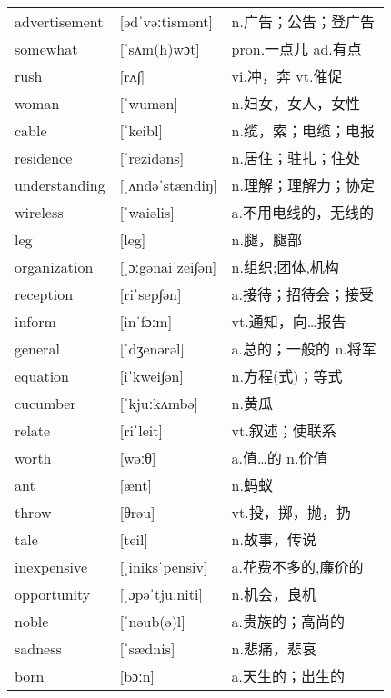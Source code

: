 \documentclass[a4paper]{article}
\begin{document}
\section{}
\begin{tabular}{l l l}

advertisement & [ədˈvəːtismənt] & n.广告；公告；登广告 \\
somewhat & [ˈsʌm(h)wɔt] & pron.一点儿 ad.有点 \\
rush & [rʌ∫] & vi.冲，奔 vt.催促 \\
woman & [ˈwumən] & n.妇女，女人，女性 \\
cable & [ˈkeibl] & n.缆，索；电缆；电报 \\
residence & [ˈrezidəns] & n.居住；驻扎；住处 \\
understanding & [ˌʌndəˈstændiŋ] & n.理解；理解力；协定 \\
wireless & [ˈwaiəlis] & a.不用电线的，无线的 \\
leg & [leg] & n.腿，腿部 \\
organization & [ˌɔːgənaiˈzei∫ən] & n.组织;团体,机构 \\
reception & [riˈsep∫ən] & a.接待；招待会；接受 \\
inform & [inˈfɔːm] & vt.通知，向…报告 \\
general & [ˈdʒenərəl] & a.总的；一般的 n.将军 \\
equation & [iˈkwei∫ən] & n.方程(式)；等式 \\
cucumber & [ˈkjuːkʌmbə] & n.黄瓜 \\
relate & [riˈleit] & vt.叙述；使联系 \\
worth & [wəːθ] & a.值…的 n.价值 \\
ant & [ænt] & n.蚂蚁 \\
throw & [θrəu] & vt.投，掷，抛，扔 \\
tale & [teil] & n.故事，传说 \\
inexpensive & [ˌiniksˈpensiv] & a.花费不多的,廉价的 \\
opportunity & [ˌɔpəˈtjuːniti] & n.机会，良机 \\
noble & [ˈnəub(ə)l] & a.贵族的；高尚的 \\
sadness & [ˈsædnis] & n.悲痛，悲哀 \\
born & [bɔːn] & a.天生的；出生的 \\

\end{tabular}
\end{document}
